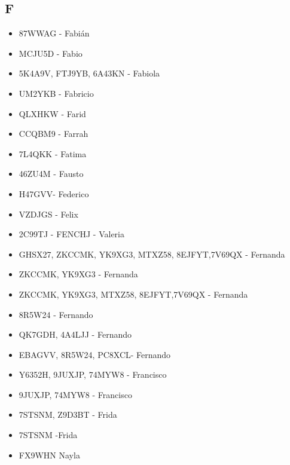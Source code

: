 \subsection*{F}
\begin{itemize}[leftmargin=*,nosep]
\item 87WWAG - Fabián
\item MCJU5D - Fabio
\item 5K4A9V, FTJ9YB, 6A43KN - Fabiola
\item UM2YKB - Fabricio
\item QLXHKW - Farid
\item CCQBM9 - Farrah
\item 7L4QKK - Fatima
\item 46ZU4M - Fausto
\item H47GVV- Federico
\item VZDJGS - Felix
\item 2C99TJ - FENCHJ - Valeria
\item GHSX27, ZKCCMK, YK9XG3, MTXZ58, 8EJFYT,7V69QX - Fernanda
\item ZKCCMK, YK9XG3 - Fernanda
\item ZKCCMK, YK9XG3, MTXZ58, 8EJFYT,7V69QX - Fernanda
\item 8R5W24 - Fernando
\item QK7GDH, 4A4LJJ - Fernando
\item EBAGVV, 8R5W24, PC8XCL- Fernando
\item Y6352H, 9JUXJP, 74MYW8 - Francisco
\item 9JUXJP, 74MYW8 - Francisco
\item 7STSNM, Z9D3BT - Frida
\item 7STSNM -Frida
\item FX9WHN Nayla
\end{itemize}

